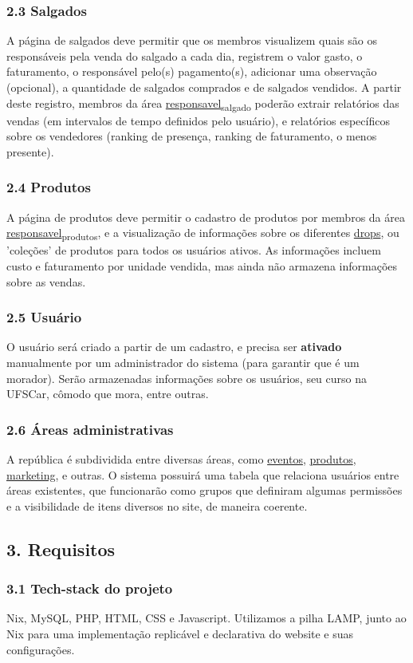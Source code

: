\documentclass[11pt]{article}
\begin{document}
\subsubsection{2.3 Salgados}
\label{sec:orga106cfc}
A página de salgados deve permitir que os membros visualizem quais são os responsáveis pela venda do salgado a cada dia, registrem o valor gasto, o faturamento, o responsável pelo(s) pagamento(s), adicionar uma observação (opcional), a quantidade de salgados comprados e de salgados vendidos.
A partir deste registro, membros da área \uline{responsavel\textsubscript{salgado}} poderão extrair relatórios das vendas (em intervalos de tempo definidos pelo usuário), e relatórios específicos sobre os vendedores (ranking de presença, ranking de faturamento, o menos presente).
\subsubsection{2.4 Produtos}
\label{sec:org94e12d4}
A página de produtos deve permitir o cadastro de produtos por membros da área \uline{responsavel\textsubscript{produtos}}, e a visualização de informações sobre os diferentes \uline{drops}, ou 'coleções' de produtos para todos os usuários ativos. As informações incluem custo e faturamento por unidade vendida, mas ainda não armazena informações sobre as vendas.
\subsubsection{2.5 Usuário}
\label{sec:orgf0ca2b0}
O usuário será criado a partir de um cadastro, e precisa ser \textbf{ativado} manualmente por um administrador do sistema (para garantir que é um morador). Serão armazenadas informações sobre os usuários, seu curso na UFSCar, cômodo que mora, entre outras.
\subsubsection{2.6 Áreas administrativas}
\label{sec:org0b55650}
A república é subdividida entre diversas áreas, como \uline{eventos}, \uline{produtos}, \uline{marketing}, e outras. O sistema possuirá uma tabela que relaciona usuários entre áreas existentes, que funcionarão como grupos que definiram algumas permissões e a visibilidade de itens diversos no site, de maneira coerente.
\subsection{3. Requisitos}
\label{sec:org2b74a48}
\subsubsection{3.1 Tech-stack do projeto}
\label{sec:org297b5d3}
Nix, MySQL, PHP, HTML, CSS e Javascript. Utilizamos a pilha LAMP, junto ao Nix para uma implementação replicável e declarativa do website e suas configurações.
\end{document}
